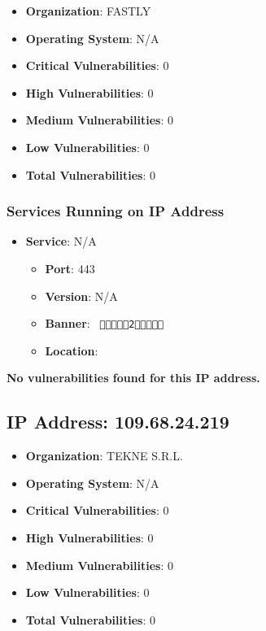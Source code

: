 \documentclass{article}
\begin{document}
\begin{itemize}
    \item \textbf{Organization}: FASTLY
    \item \textbf{Operating System}:  N/A 
    \item \textbf{Critical Vulnerabilities}: 0
    \item \textbf{High Vulnerabilities}: 0
    \item \textbf{Medium Vulnerabilities}: 0
    \item \textbf{Low Vulnerabilities}: 0
    \item \textbf{Total Vulnerabilities}: 0
\end{itemize}

\subsubsection*{Services Running on IP Address}

\begin{itemize}
    
        \item \textbf{Service}: N/A
        \begin{itemize}
            \item \textbf{Port}: 443
            \item \textbf{Version}:  N/A 
            \item \textbf{Banner}: \texttt{  2   }
            \item \textbf{Location}: \href{  }{  }
        \end{itemize}
    
\end{itemize}


\textbf{No vulnerabilities found for this IP address.}


\clearpage



\subsection*{IP Address: 109.68.24.219}

\begin{itemize}
    \item \textbf{Organization}: TEKNE S.R.L.
    \item \textbf{Operating System}:  N/A 
    \item \textbf{Critical Vulnerabilities}: 0
    \item \textbf{High Vulnerabilities}: 0
    \item \textbf{Medium Vulnerabilities}: 0
    \item \textbf{Low Vulnerabilities}: 0
    \item \textbf{Total Vulnerabilities}: 0
\end{itemize}
\end{document}
